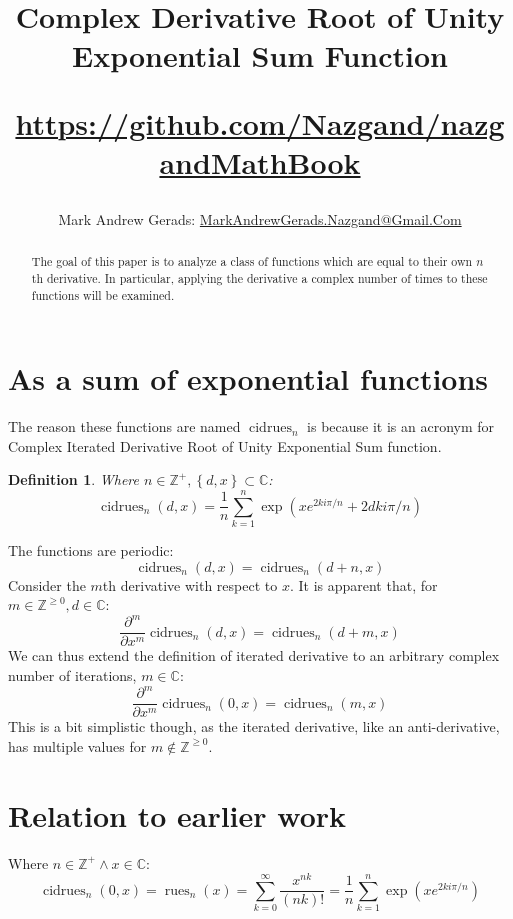 \documentclass[]{article}
\author{Mark Andrew Gerads: \href{MailTo:MarkAndrewGerads.Nazgand@Gmail.Com}{MarkAndrewGerads.Nazgand@Gmail.Com}}
\title{
	Complex Derivative Root of Unity Exponential Sum Function
	
	\href{https://github.com/Nazgand/nazgandMathBook}{https://github.com/Nazgand/nazgandMathBook}
}
\DeclareMathOperator{\rues}{rues}
\DeclareMathOperator{\cidrues}{cidrues}
\newcommand{\pqty}[1]{{\left(#1\right)}}
\newcommand{\Bqty}[1]{{\left\{#1\right\}}}
\newcommand{\pdiff}[2]{\frac{\partial^{#2}}{\partial #1^{#2}}}
\newtheorem{definition}[theorem]{Definition}
\numberwithin{equation}{section}
\begin{document}
	
	\maketitle
	
	\begin{abstract}
		The goal of this paper is to analyze a class of functions which are equal to their own \(n\)th derivative. In particular, applying the derivative a complex number of times to these functions will be examined.
	\end{abstract}
	
	\section{As a sum of exponential functions}
	The reason these functions are named $\cidrues_n$ is because it is an acronym for Complex Iterated Derivative Root of Unity Exponential Sum function.
	\begin{definition}
		Where $n\in\mathbb{Z}^+,\Bqty{d,x}\subset\mathbb{C}$:
		\begin{equation}
		\label{cidrues Exponential sum form}
		\cidrues_n\pqty{d,x}=
		\frac{1}{n}\sum _{k=1}^n \exp\pqty{xe^{2ki\pi/n}+2dki\pi/n}
		\end{equation}
	\end{definition}
	The functions are periodic:
	\begin{equation}
	\cidrues_n\pqty{d,x}=\cidrues_n\pqty{d+n,x}
	\end{equation}
	Consider the $m$th derivative with respect to $x$. It is apparent that, for $m\in\mathbb{Z}^{\geq 0},d\in\mathbb{C}$:
	\begin{equation}
	\pdiff{x}{m}\cidrues_n\pqty{d,x}=\cidrues_n\pqty{d+m,x}
	\end{equation}
	We can thus extend the definition of iterated derivative to an arbitrary complex number of iterations, $m\in\mathbb{C}$:
	\begin{equation}
	\pdiff{x}{m}\cidrues_n\pqty{0,x}=\cidrues_n\pqty{m,x}
	\end{equation}
	This is a bit simplistic though, as the iterated derivative, like an anti-derivative, has multiple values for $m\not\in\mathbb{Z}^{\geq 0}$.
		
	\section{Relation to earlier work}
	Where \(n\in\mathbb{Z}^+\land x\in\mathbb{C}\):
	\begin{equation}
		\cidrues_n\pqty{0,x}=
		\rues_n\pqty{x}=
		\sum_{k=0}^{\infty}\frac{x^{nk}}{\pqty{nk}!}=
		\frac{1}{n}\sum _{k=1}^n \exp\pqty{xe^{2ki\pi/n}}
	\end{equation}
	
\end{document}
